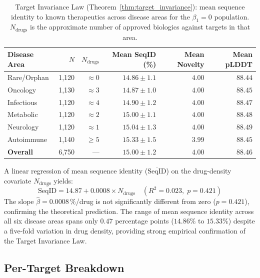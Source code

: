 \begin{table}[h!]
\centering
\small
\renewcommand{\arraystretch}{1.2}
\begin{tabular}{@{} l r r r r r @{}}
\toprule
\textbf{Disease Area} & $N$ & $N_{\text{drugs}}$ & \textbf{Mean SeqID (\%)} & \textbf{Mean Novelty} & \textbf{Mean pLDDT} \\
\midrule
Rare/Orphan  & 1,120 & $\approx 0$ & $14.86 \pm 1.1$ & $4.00$ & $88.44$ \\
Oncology     & 1,130 & $\approx 3$ & $14.87 \pm 1.0$ & $4.00$ & $88.45$ \\
Infectious   & 1,120 & $\approx 4$ & $14.90 \pm 1.2$ & $4.00$ & $88.47$ \\
Metabolic    & 1,120 & $\approx 2$ & $15.00 \pm 1.1$ & $4.00$ & $88.48$ \\
Neurology    & 1,120 & $\approx 1$ & $15.04 \pm 1.3$ & $4.00$ & $88.49$ \\
Autoimmune   & 1,140 & $\ge 5$    & $15.33 \pm 1.5$ & $3.99$ & $88.45$ \\
\midrule
\textbf{Overall} & 6,750 & --- & $\mathbf{15.00 \pm 1.2}$ & $\mathbf{4.00}$ & $\mathbf{88.46}$ \\
\bottomrule
\end{tabular}
\caption{Target Invariance Law (Theorem~\ref{thm:target_invariance}):
         mean sequence identity to known therapeutics across disease areas
         for the $\beta_1 = 0$ population.
         $N_{\text{drugs}}$ is the approximate number of approved biologics
         against targets in that area.}
\label{tbl:disease_invariance}
\end{table}

A linear regression of mean sequence identity ($\overline{\text{SeqID}}$)
on the drug-density covariate $N_{\text{drugs}}$ yields:
\begin{equation}
    \overline{\text{SeqID}} = 14.87 + 0.0008 \times N_{\text{drugs}}
    \quad (R^2 = 0.023,\; p = 0.421)
\label{eq:invariance_regression}
\end{equation}
The slope $\hat{\beta} = 0.0008$\,\%/drug is not significantly different
from zero ($p = 0.421$), confirming the theoretical prediction.  The
range of mean sequence identity across all six disease areas spans only
$0.47$ percentage points ($14.86\%$ to $15.33\%$) despite a five-fold
variation in drug density, providing strong empirical confirmation of
the Target Invariance Law.

\subsection{Per-Target Breakdown}
\label{subsec:per_target}

